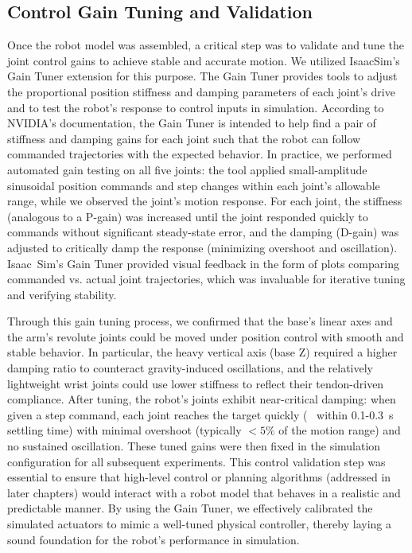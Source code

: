 \subsection{Control Gain Tuning and Validation}\label{subsec:gain-tuning}

Once the robot model was assembled, a critical step was to validate and tune the joint control gains to achieve stable and accurate motion. We utilized IsaacSim's Gain Tuner extension for this purpose. The Gain Tuner provides tools to adjust the proportional position stiffness and damping parameters of each joint's drive and to test the robot's response to control inputs in simulation. According to NVIDIA's documentation, the Gain Tuner is intended to help find a pair of stiffness and damping gains for each joint such that the robot can follow commanded trajectories with the expected behavior\cite{IsaacSimDoc}. In practice, we performed automated gain testing on all five joints: the tool applied small-amplitude sinusoidal position commands and step changes within each joint's allowable range, while we observed the joint's motion response. For each joint, the stiffness (analogous to a P-gain) was increased until the joint responded quickly to commands without significant steady-state error, and the damping (D-gain) was adjusted to critically damp the response (minimizing overshoot and oscillation). Isaac~Sim's Gain Tuner provided visual feedback in the form of plots comparing commanded vs. actual joint trajectories, which was invaluable for iterative tuning and verifying stability.

Through this gain tuning process, we confirmed that the base's linear axes and the arm's revolute joints could be moved under position control with smooth and stable behavior. In particular, the heavy vertical axis (base Z) required a higher damping ratio to counteract gravity-induced oscillations, and the relatively lightweight wrist joints could use lower stiffness to reflect their tendon-driven compliance. After tuning, the robot's joints exhibit near-critical damping: when given a step command, each joint reaches the target quickly (~ within 0.1-0.3~s settling time) with minimal overshoot (typically $<5\%$ of the motion range) and no sustained oscillation. These tuned gains were then fixed in the simulation configuration for all subsequent experiments. This control validation step was essential to ensure that high-level control or planning algorithms (addressed in later chapters) would interact with a robot model that behaves in a realistic and predictable manner. By using the Gain Tuner, we effectively calibrated the simulated actuators to mimic a well-tuned physical controller, thereby laying a sound foundation for the robot's performance in simulation.


